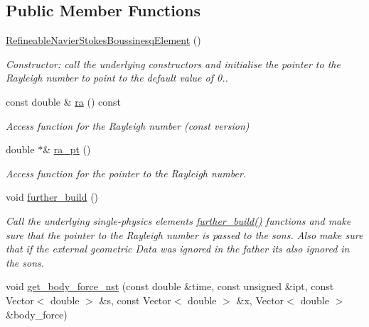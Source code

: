 \subsection*{Public Member Functions}
\begin{DoxyCompactItemize}
\item 
\hyperlink{classoomph_1_1RefineableNavierStokesBoussinesqElement_af9fd72e50fb7d6aaf43bd982ce3de295}{Refineable\+Navier\+Stokes\+Boussinesq\+Element} ()
\begin{DoxyCompactList}\small\item\em Constructor\+: call the underlying constructors and initialise the pointer to the Rayleigh number to point to the default value of 0.. \end{DoxyCompactList}\item 
const double \& \hyperlink{classoomph_1_1RefineableNavierStokesBoussinesqElement_ae18350ad83634633acea59b60123d3c0}{ra} () const
\begin{DoxyCompactList}\small\item\em Access function for the Rayleigh number (const version) \end{DoxyCompactList}\item 
double $\ast$\& \hyperlink{classoomph_1_1RefineableNavierStokesBoussinesqElement_ac2f3ff1714a6859b151da46109eda0ae}{ra\+\_\+pt} ()
\begin{DoxyCompactList}\small\item\em Access function for the pointer to the Rayleigh number. \end{DoxyCompactList}\item 
void \hyperlink{classoomph_1_1RefineableNavierStokesBoussinesqElement_a8b7b18f473b0fa9c4127de305e5a6ccc}{further\+\_\+build} ()
\begin{DoxyCompactList}\small\item\em Call the underlying single-\/physics element\textquotesingle{}s \hyperlink{classoomph_1_1RefineableNavierStokesBoussinesqElement_a8b7b18f473b0fa9c4127de305e5a6ccc}{further\+\_\+build()} functions and make sure that the pointer to the Rayleigh number is passed to the sons. Also make sure that if the external geometric Data was ignored in the father it\textquotesingle{}s also ignored in the sons. \end{DoxyCompactList}\item 
void \hyperlink{classoomph_1_1RefineableNavierStokesBoussinesqElement_a7c422f8666f9acef4d26f187a4dc4e28}{get\+\_\+body\+\_\+force\+\_\+nst} (const double \&time, const unsigned \&ipt, const Vector$<$ double $>$ \&s, const Vector$<$ double $>$ \&x, Vector$<$ double $>$ \&body\+\_\+force)

\end{DoxyCompactItemize}
